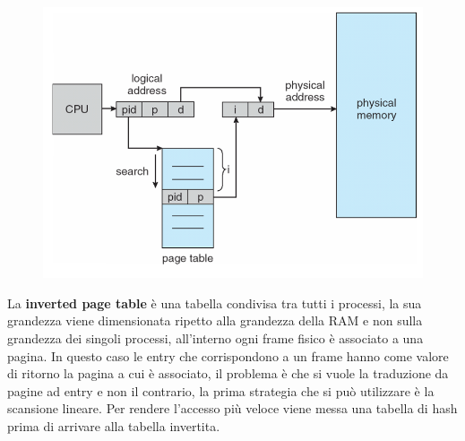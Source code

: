 \documentclass[12pt]{article}
\begin{document}
\begin{figure}
  \centering
  \includegraphics[width=1\linewidth]{inverted-page-table.png}
\end{figure}
La \textbf{inverted page table} \`e una tabella condivisa tra tutti i processi, la sua grandezza viene dimensionata ripetto alla grandezza della RAM e non sulla grandezza dei singoli processi, all'interno ogni frame fisico \`e associato a una pagina. In questo caso le entry che corrispondono a un frame hanno come valore di ritorno la pagina a cui \`e associato, il problema \`e che si vuole la traduzione da pagine ad entry e non il contrario, la prima strategia che si pu\`o utilizzare \`e la scansione lineare. Per rendere l'accesso pi\`u veloce viene messa una tabella di hash prima di arrivare alla tabella invertita.
\end{document}
